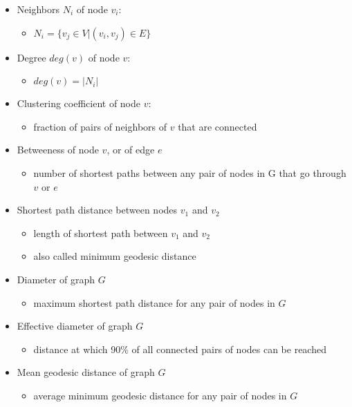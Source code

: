 \documentclass[../notes.tex]{subfiles}
\begin{document}
\begin{itemize}
  \item Neighbors $N_i$ of node $v_i$:
  \begin{itemize}
    \item $N_i = \{v_j \in V | (v_i, v_j) \in E \}$    
  \end{itemize}

  \item Degree $deg(v)$ of node $v$: 
  \begin{itemize}
    \item $deg(v) = |N_i|$
  \end{itemize}  

  \item Clustering coefficient of node $v$:
  \begin{itemize}
    \item fraction of pairs of neighbors of $v$ that are connected
  \end{itemize}  

  \item Betweeness of node $v$, or of edge $e$
  \begin{itemize}
    \item number of shortest paths between any pair of nodes in G that go through $v$ or $e$
  \end{itemize}  

  \item Shortest path distance between nodes $v_1$ and $v_2$
  \begin{itemize}
    \item length of shortest path between $v_1$ and $v_2$
    \item also called minimum geodesic distance
  \end{itemize}

  \item Diameter of graph $G$
  \begin{itemize}
    \item maximum shortest path distance for any pair of nodes in $G$
  \end{itemize}

  \item Effective diameter of graph $G$
  \begin{itemize}
    \item distance at which 90\% of all connected pairs of nodes can be reached
  \end{itemize}

  \item Mean geodesic distance of graph $G$
  \begin{itemize}
    \item average minimum geodesic distance for any pair of nodes in $G$
  \end{itemize}


\end{itemize}
\end{document}
